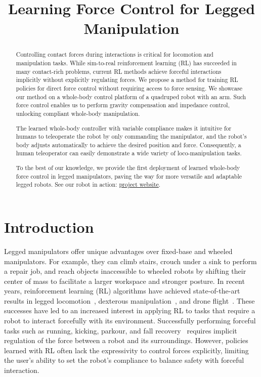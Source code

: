 
\title{\LARGE \bf 
Learning Force Control for Legged Manipulation
}
\maketitle
\thispagestyle{empty}
\pagestyle{empty}

\begin{abstract}

Controlling contact forces during interactions is critical for locomotion and manipulation tasks. While sim-to-real reinforcement learning (RL) has succeeded in many contact-rich problems, current RL methods achieve forceful interactions implicitly without explicitly regulating forces. We propose a method for training RL policies for direct force control without requiring access to force sensing. We showcase our method on a whole-body control platform of a quadruped robot with an arm. Such force control enables us to perform gravity compensation and impedance control, unlocking compliant whole-body manipulation.   

The learned whole-body controller with variable compliance makes it intuitive for humans to teleoperate the robot by only commanding the manipulator, and the robot's body adjusts automatically to achieve the desired position and force. Consequently, a human teleoperator can easily demonstrate a wide variety of loco-manipulation tasks.  

To the best of our knowledge, we provide the first deployment of learned whole-body force control in legged manipulators, paving the way for more versatile and adaptable legged robots. See our robot in action: \href{\projectwebsite}{project website}.
\end{abstract}


\section{Introduction}


Legged manipulators offer unique advantages over fixed-base and wheeled manipulators. For example, they can climb stairs, crouch under a sink to perform a repair job, and reach objects inaccessible to wheeled robots by shifting their center of mass to facilitate a larger workspace and stronger posture.
In recent years, reinforcement learning (RL) algorithms have achieved state-of-the-art results in legged locomotion~\cite{hwangbo2019learning, kumar2021rma, rudin2022learning, margolis2022rapid}, dexterous manipulation~\cite{chen2021system,chen2022visual}, and drone flight~\cite{kaufmann2023champion}. These successes have led to an increased interest in applying RL to tasks that require a robot to interact forcefully with its environment. Successfully performing forceful tasks such as running, kicking, parkour, and fall recovery~\cite{fu2023deep, ji2023dribblebot, ma2023learning, hoeller2023anymal, zhuang2023robot, cheng2023extreme} requires implicit regulation of the force between a robot and its surroundings. However, policies learned with RL often lack the expressivity to control forces explicitly, limiting the user's ability to set the robot's compliance to balance safety with forceful interaction.

